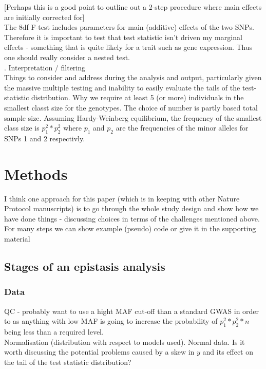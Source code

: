 \documentclass{article}
\begin{document}
[Perhaps this is a good point to outline out a 2-step procedure where main effects are initially corrected for] \\
The 8df F-test includes parameters for main (additive) effects of the two SNPs. Therefore it is important to test that test statistic isn't driven my marginal effects - something that is quite likely for a trait such as gene expression. Thus one should really consider a nested test.  \\
. Interpretation / filtering \\
\newline
Things to consider and address during the analysis and output, particularly given the massive multiple testing and inability to easily evaluate the tails of the test-statistic distribution. Why we require at least 5 (or more) individuals in the smallest classt size for the genotypes. The choice of number is partly based total sample size. Assuming Hardy-Weinberg equilibrium, the frequency of the smallest class size is $p_1^2 * p_2^2$ where $p_1$ and $p_2$ are the frequencies of the minor alleles for SNPs 1 and 2 respectivly.      
\newline
\section{Methods}

I think one approach for this paper (which is in keeping with other Nature Protocol manuscripts) is to go through the whole study design and show how we have done things - discussing choices in terms of the challenges mentioned above. For many steps we can show example (pseudo) code or give it in the supporting material  

\subsection{Stages of an epistasis analysis}

\subsubsection{Data}

QC - probably want to use a hight MAF cut-off than a standard GWAS in order to as anything with low MAF is going to increase the probability of $p_1^2 * p_2^2 * n$ being less than a required level. \\
Normalisation (distribution with respect to models used). Normal data. Is it worth discussing the potential problems caused by a skew in $y$ and its effect on the tail of the test statistic distribution?  \\
\end{document}
